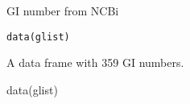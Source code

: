 \begin{Description} GI number from NCBi
\end{Description}
\begin{Usage}
\begin{verbatim}data(glist)\end{verbatim}
\end{Usage}
\begin{Format}\relax
A data frame with 359 GI numbers.
\end{Format}
\begin{Examples}
\begin{ExampleCode}
data(glist)

\end{ExampleCode}
\end{Examples}

